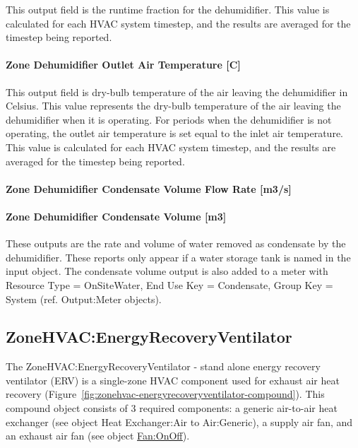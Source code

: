 This output field is the runtime fraction for the dehumidifier. This value is calculated for each HVAC system timestep, and the results are averaged for the timestep being reported.

\paragraph{Zone Dehumidifier Outlet Air Temperature {[}C{]}}\label{zone-dehumidifier-outlet-air-temperature-c}

This output field is dry-bulb temperature of the air leaving the dehumidifier in Celsius. This value represents the dry-bulb temperature of the air leaving the dehumidifier when it is operating. For periods when the dehumidifier is not operating, the outlet air temperature is set equal to the inlet air temperature. This value is calculated for each HVAC system timestep, and the results are averaged for the timestep being reported.

\paragraph{Zone Dehumidifier Condensate Volume Flow Rate {[}m3/s{]}}\label{zone-dehumidifier-condensate-volume-flow-rate-m3s}

\paragraph{Zone Dehumidifier Condensate Volume {[}m3{]}}\label{zone-dehumidifier-condensate-volume-m3}

These outputs are the rate and volume of water removed as condensate by the dehumidifier. These reports only appear if a water storage tank is named in the input object. The condensate volume output is also added to a meter with Resource Type = OnSiteWater, End Use Key = Condensate, Group Key = System (ref. Output:Meter objects).

\subsection{ZoneHVAC:EnergyRecoveryVentilator}\label{zonehvacenergyrecoveryventilator}

The ZoneHVAC:EnergyRecoveryVentilator - stand alone energy recovery ventilator (ERV) is a single-zone HVAC component used for exhaust air heat recovery (Figure~\ref{fig:zonehvac-energyrecoveryventilator-compound}). This compound object consists of 3 required components: a generic air-to-air heat exchanger (see object Heat Exchanger:Air to Air:Generic), a supply air fan, and an exhaust air fan (see object \hyperref[fanonoff]{Fan:OnOff}).

